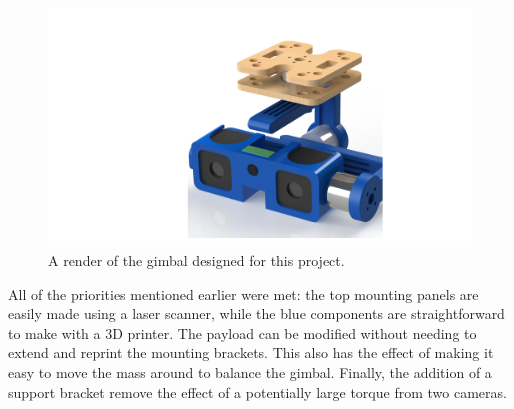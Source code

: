 \begin{figure}[h!]
  \centering
  \includegraphics[width=\textwidth]{methodology/assembled_render}
  \caption{\label{fig:assembled_render} A render of the gimbal designed for this project.}
\end{figure}

All of the priorities mentioned earlier were met: the top mounting panels are easily made using a laser scanner, while the blue components are straightforward to make with a 3D printer. The payload can be modified without needing to extend and reprint the mounting brackets. This also has the effect of making it easy to move the mass around to balance the gimbal. Finally, the addition of a support bracket remove the effect of a potentially large torque from two cameras.


